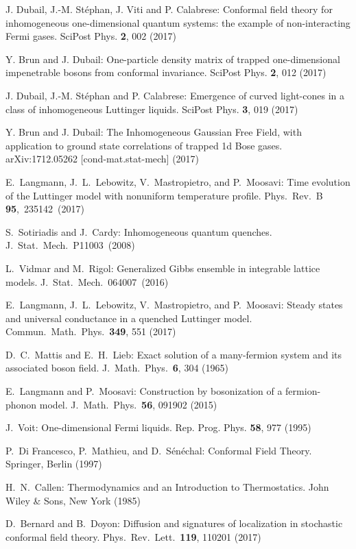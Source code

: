 \documentclass[12pt,a4paper]{article}
\theoremstyle{definition}
\theoremstyle{remark}
\begin{document}
\begin{thebibliography}{99}
 J. Dubail, J.-M. St\'ephan, J. Viti and P. Calabrese:
Conformal field theory for inhomogeneous one-dimensional quantum systems:
the example of non-interacting Fermi gases. SciPost Phys. {\bf2}, 002 (2017)

 Y. Brun and J. Dubail: One-particle density matrix of trapped
one-dimensional impenetrable bosons from conformal invariance.
SciPost Phys. {\bf2}, 012 (2017)

 J. Dubail, J.-M. St\'ephan and P. Calabrese: Emergence
of curved light-cones in a class of inhomogeneous Luttinger liquids.
SciPost Phys. {\bf3}, 019 (2017)

 Y. Brun and J. Dubail: The Inhomogeneous Gaussian Free Field,
with application to ground state correlations of trapped 1d Bose gases.
arXiv:1712.05262 [cond-mat.stat-mech] (2017)

 E.\ Langmann, J.\ L.\ Lebowitz, V.\ Mastropietro, 
and P.\ Moosavi:
Time evolution of the Luttinger model with nonuniform temperature profile.
Phys.\ Rev.\ B {\bf 95},\ 235142\ (2017)

 S.\ Sotiriadis and J.\ Cardy:
Inhomogeneous quantum quenches. J.\ Stat.\ Mech.\ P11003\ (2008) 

 L.\ Vidmar and M.\ Rigol:
Generalized Gibbs ensemble in integrable lattice models.
J.\ Stat.\ Mech.\ 064007\ (2016) 

 E.\ Langmann, J.\ L.\ Lebowitz, V.\ Mastropietro, 
and P.\ Moosavi:
Steady states and universal conductance in a quenched Luttinger model. 
Commun.\ Math.\ Phys.\ {\bf 349}, 551 (2017)

 D.\ C.\ Mattis and E.\ H.\ Lieb:
Exact solution of a many-fermion system and its associated boson field.
J.\ Math.\ Phys.\ {\bf 6}, 304 (1965)

 E.\ Langmann and P.\ Moosavi:
Construction by bosonization of a fermion-phonon model.
J.\ Math.\ Phys.\ {\bf 56}, 091902 (2015)

 J.\ Voit:
One-dimensional Fermi liquids.
Rep. Prog. Phys. {\bf 58}, 977 (1995)

 P.\ Di Francesco, P.\ Mathieu, and D.\ S{\'e}n{\'e}chal: 
Conformal Field Theory.
Springer, Berlin (1997)

 H.\ N.\ Callen:
Thermodynamics and an Introduction to Thermostatics.
John Wiley \& Sons, New York (1985)

 D.\ Bernard and B.\ Doyon:
Diffusion and signatures of localization in stochastic conformal field theory.
Phys.\ Rev.\ Lett.\ {\bf 119}, 110201 (2017)


\end{thebibliography}
\end{document}
